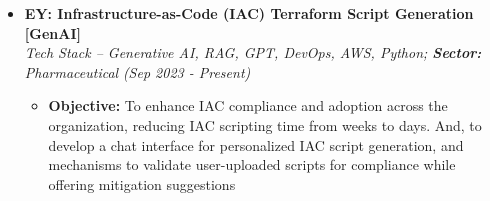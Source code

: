 \documentclass[a4paper,10pt]{article}
\newcommand{\isep}{-2 pt}
\begin{document}
\begin{itemize}
\item \textbf{EY: Infrastructure-as-Code (IAC) Terraform Script Generation [GenAI]}  \\
    \emph{Tech Stack -- Generative AI, RAG, GPT, DevOps, AWS, Python;  \qquad \textbf{Sector:} Pharmaceutical} \hfill {\emph{(Sep 2023 - Present)}}
    \\[-0.6cm]
    \begin{itemize}\itemsep \isep
    \item \textbf{Objective:} To enhance IAC compliance and adoption across the organization, reducing IAC scripting time from weeks to days. And, to develop a chat interface for personalized IAC script generation, and mechanisms to validate user-uploaded scripts for compliance while offering mitigation suggestions


\end{itemize}
\end{itemize}
\end{document}
